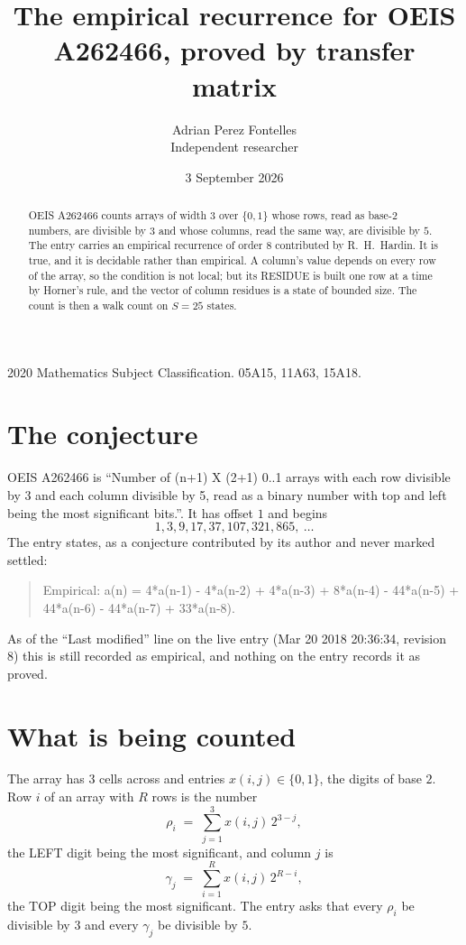 \documentclass[11pt,a4paper]{article}
\title{The empirical recurrence for OEIS A262466, proved by transfer matrix}
\author{Adrian Perez Fontelles\\ \small Independent researcher}
\date{3 September 2026}
\theoremstyle{plain}
\theoremstyle{definition}
\begin{document}
\maketitle

\begin{abstract}
OEIS A262466 counts arrays of width $3$ over $\{0,1\}$ whose rows, read as base-$2$
numbers, are divisible by $3$ and whose columns, read the same way, are divisible by
$5$. The entry carries an empirical recurrence of order $8$ contributed by
R.~H.~Hardin. It is true, and it is decidable rather than empirical. A column's value depends on
every row of the array, so the condition is not local; but its RESIDUE is built one row at a
time by Horner's rule, and the vector of column residues is a state of bounded size. The count
is then a walk count on $S=25$ states.
\end{abstract}

\noindent\small 2020 Mathematics Subject Classification. 05A15, 11A63, 15A18.\normalsize

\section{The conjecture}

OEIS A262466 is ``Number of (n+1) X (2+1) 0..1 arrays with each row divisible by 3 and each column divisible by 5, read as a binary number with top and left being the most significant bits.''. It has offset $1$ and begins
\[
1, 3, 9, 17, 37, 107, 321, 865,\ \dots
\]
The entry states, as a conjecture contributed by its author and never marked settled:
\begin{quote}
Empirical: a(n) = 4*a(n-1) - 4*a(n-2) + 4*a(n-3) + 8*a(n-4) - 44*a(n-5) + 44*a(n-6) - 44*a(n-7) + 33*a(n-8).
\end{quote}
As of the ``Last modified'' line on the live entry (Mar 20 2018 20:36:34, revision 8) this is still
recorded as empirical, and nothing on the entry records it as proved.

\section{What is being counted}

The array has $3$ cells across and entries $x(i,j)\in\{0,1\}$, the digits of
base $2$. Row $i$ of an array with $R$ rows is the number
\[
\rho_i\;=\;\sum_{j=1}^{3}x(i,j)\,2^{3-j} ,
\]
the LEFT digit being the most significant, and column $j$ is
\[
\gamma_j\;=\;\sum_{i=1}^{R}x(i,j)\,2^{R-i} ,
\]
the TOP digit being the most significant. The entry asks that every $\rho_i$ be divisible by
$3$ and every $\gamma_j$ be divisible by $5$.
\end{document}
